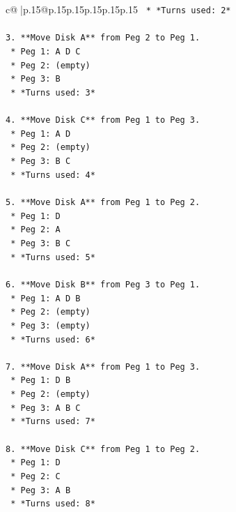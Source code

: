 \documentclass{article}
\begin{document}
{\begin{supertabular}{c@{$\;$}|p{.15\linewidth}@{}p{.15\linewidth}p{.15\linewidth}p{.15\linewidth}p{.15\linewidth}p{.15\linewidth}}
{{{\texttt{    *   *Turns used: 2*} \\
\\ 
\texttt{3.  **Move Disk A** from Peg 2 to Peg 1.} \\
\texttt{    *   Peg 1: A D C} \\
\texttt{    *   Peg 2: (empty)} \\
\texttt{    *   Peg 3: B} \\
\texttt{    *   *Turns used: 3*} \\
\\ 
\texttt{4.  **Move Disk C** from Peg 1 to Peg 3.} \\
\texttt{    *   Peg 1: A D} \\
\texttt{    *   Peg 2: (empty)} \\
\texttt{    *   Peg 3: B C} \\
\texttt{    *   *Turns used: 4*} \\
\\ 
\texttt{5.  **Move Disk A** from Peg 1 to Peg 2.} \\
\texttt{    *   Peg 1: D} \\
\texttt{    *   Peg 2: A} \\
\texttt{    *   Peg 3: B C} \\
\texttt{    *   *Turns used: 5*} \\
\\ 
\texttt{6.  **Move Disk B** from Peg 3 to Peg 1.} \\
\texttt{    *   Peg 1: A D B} \\
\texttt{    *   Peg 2: (empty)} \\
\texttt{    *   Peg 3: (empty)} \\
\texttt{    *   *Turns used: 6*} \\
\\ 
\texttt{7.  **Move Disk A** from Peg 1 to Peg 3.} \\
\texttt{    *   Peg 1: D B} \\
\texttt{    *   Peg 2: (empty)} \\
\texttt{    *   Peg 3: A B C} \\
\texttt{    *   *Turns used: 7*} \\
\\ 
\texttt{8.  **Move Disk C** from Peg 1 to Peg 2.} \\
\texttt{    *   Peg 1: D} \\
\texttt{    *   Peg 2: C} \\
\texttt{    *   Peg 3: A B} \\
\texttt{    *   *Turns used: 8*} \\
}}}
\end{supertabular}}
\end{document}

